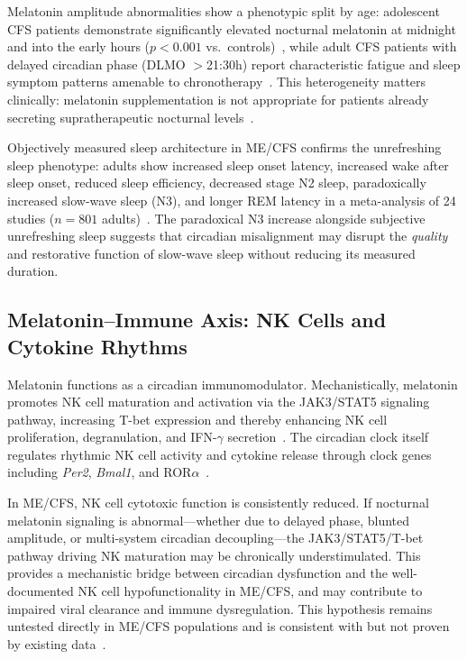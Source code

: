 Melatonin amplitude abnormalities show a phenotypic split by age: adolescent CFS patients demonstrate significantly elevated nocturnal melatonin at midnight and into the early hours ($p<0.001$ vs.~controls)~\cite{Knook2000melatonin}, while adult CFS patients with delayed circadian phase (DLMO $>$21:30h) report characteristic fatigue and sleep symptom patterns amenable to chronotherapy~\cite{vanHeukelom2006melatonin}. This heterogeneity matters clinically: melatonin supplementation is not appropriate for patients already secreting supratherapeutic nocturnal levels~\cite{Knook2000melatonin}.

Objectively measured sleep architecture in ME/CFS confirms the unrefreshing sleep phenotype: adults show increased sleep onset latency, increased wake after sleep onset, reduced sleep efficiency, decreased stage N2 sleep, paradoxically increased slow-wave sleep (N3), and longer REM latency in a meta-analysis of 24 studies ($n=801$ adults)~\cite{Mohamed2023sleep}. The paradoxical N3 increase alongside subjective unrefreshing sleep suggests that circadian misalignment may disrupt the \emph{quality} and restorative function of slow-wave sleep without reducing its measured duration.

\subsection{Melatonin--Immune Axis: NK Cells and Cytokine Rhythms}

Melatonin functions as a circadian immunomodulator. Mechanistically, melatonin promotes NK cell maturation and activation via the JAK3/STAT5 signaling pathway, increasing T-bet expression and thereby enhancing NK cell proliferation, degranulation, and IFN-$\gamma$ secretion~\cite{Liang2024NKcell}. The circadian clock itself regulates rhythmic NK cell activity and cytokine release through clock genes including \emph{Per2}, \emph{Bmal1}, and ROR$\alpha$~\cite{scheiermann2018circadian}.

\begin{speculation}
\label{spec:ch15-melatonin-nk}
In ME/CFS, NK cell cytotoxic function is consistently reduced. If nocturnal melatonin signaling is abnormal---whether due to delayed phase, blunted amplitude, or multi-system circadian decoupling---the JAK3/STAT5/T-bet pathway driving NK maturation may be chronically understimulated. This provides a mechanistic bridge between circadian dysfunction and the well-documented NK cell hypofunctionality in ME/CFS, and may contribute to impaired viral clearance and immune dysregulation. This hypothesis remains untested directly in ME/CFS populations and is consistent with but not proven by existing data~\cite{Liang2024NKcell,McCarthy2022circadian,Anderson2020mitochondriaMECFS}.
\end{speculation}

